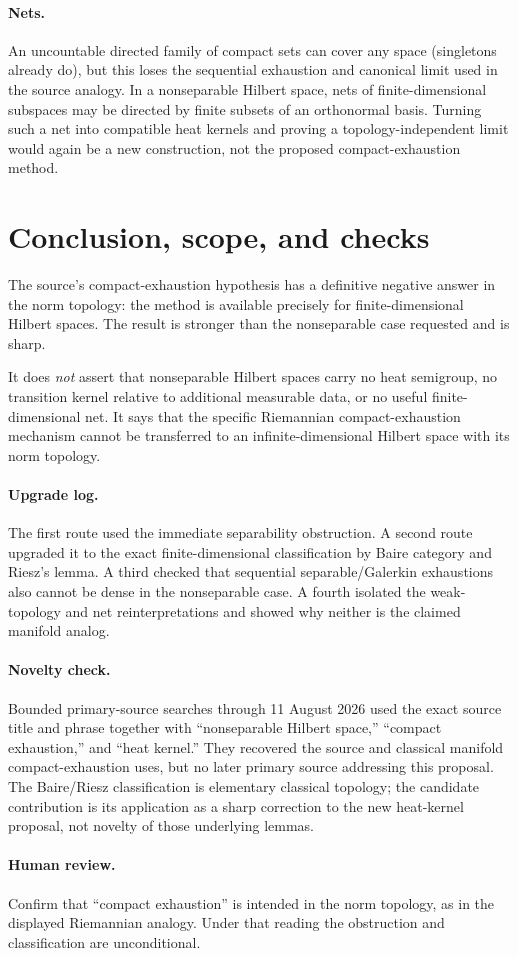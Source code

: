 \documentclass[11pt]{article}
\begin{document}
\paragraph{Nets.}
An uncountable directed family of compact sets can cover any space (singletons
already do), but this loses the sequential exhaustion and canonical limit
used in the source analogy.  In a nonseparable Hilbert space, nets of
finite-dimensional subspaces may be directed by finite subsets of an
orthonormal basis.  Turning such a net into compatible heat kernels and
proving a topology-independent limit would again be a new construction, not
the proposed compact-exhaustion method.

\section{Conclusion, scope, and checks}

The source's compact-exhaustion hypothesis has a definitive negative answer
in the norm topology: the method is available precisely for
finite-dimensional Hilbert spaces.  The result is stronger than the
nonseparable case requested and is sharp.

It does \emph{not} assert that nonseparable Hilbert spaces carry no heat
semigroup, no transition kernel relative to additional measurable data, or
no useful finite-dimensional net.  It says that the specific Riemannian
compact-exhaustion mechanism cannot be transferred to an
infinite-dimensional Hilbert space with its norm topology.

\paragraph{Upgrade log.}
The first route used the immediate separability obstruction.  A second route
upgraded it to the exact finite-dimensional classification by Baire category
and Riesz's lemma.  A third checked that sequential separable/Galerkin
exhaustions also cannot be dense in the nonseparable case.  A fourth isolated
the weak-topology and net reinterpretations and showed why neither is the
claimed manifold analog.

\paragraph{Novelty check.}
Bounded primary-source searches through 11 August 2026 used the exact source
title and phrase together with ``nonseparable Hilbert space,'' ``compact
exhaustion,'' and ``heat kernel.''  They recovered the source and classical
manifold compact-exhaustion uses, but no later primary source addressing this
proposal.  The Baire/Riesz classification is elementary classical topology;
the candidate contribution is its application as a sharp correction to the
new heat-kernel proposal, not novelty of those underlying lemmas.

\paragraph{Human review.}
Confirm that ``compact exhaustion'' is intended in the norm topology, as in
the displayed Riemannian analogy.  Under that reading the obstruction and
classification are unconditional.
\end{document}
